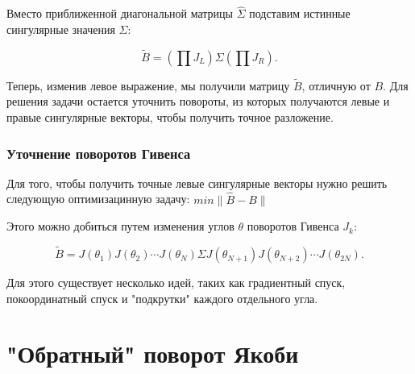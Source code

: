 Вместо приближенной диагональной матрицы \( \widehat{\Sigma} \) подставим истинные сингулярные значения \( \Sigma \):

\begin{equation}
\tilde{B} = \left( \prod J_L \right) \Sigma \left( \prod J_R \right).
\end{equation}

Теперь, изменив левое выражение, мы получили матрицу $\tilde{B}$, отличную от $B$. Для решения задачи остается уточнить повороты, из которых получаются левые и правые сингулярные векторы, чтобы получить точное разложение.

\subsubsection{Уточнение поворотов Гивенса}

Для того, чтобы получить точные левые сингулярные векторы нужно решить следующую оптимизацинную задачу:
\( 
min\| \widehat{B} - B \| 
\)

Этого можно добиться путем изменения углов \( \theta \) поворотов Гивенса \( J_k \):

\begin{equation}
\tilde{B} = J(\theta_1) J(\theta_2) \cdots J(\theta_N) \Sigma J(\theta_{N+1}) J(\theta_{N+2}) \cdots J(\theta_{2N}).
\end{equation}

Для этого существует несколько идей, таких как градиентный спуск, покоординатный спуск и "подкрутки" каждого отдельного угла.


\newpage
\section{"Обратный" поворот Якоби}

